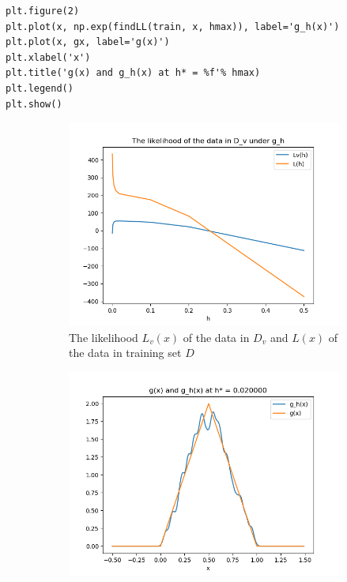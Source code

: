 \documentclass[preprint,12pt]{elsarticle}
\begin{document}
\begin{enumerate}[label=\alph*]
\begin{lstlisting}
plt.figure(2)
plt.plot(x, np.exp(findLL(train, x, hmax)), label='g_h(x)')
plt.plot(x, gx, label='g(x)')
plt.xlabel('x')
plt.title('g(x) and g_h(x) at h* = %f'% hmax)
plt.legend()
plt.show()
        \end{lstlisting}
        \begin{figure}[htbp!]
            \center
            \begin{subfigure}{0.8\textwidth}
                \includegraphics[width = \textwidth]{8.png}
                \caption{The likelihood $L_v(x)$ of the data in $D_v$ and 
                $L(x)$ of the data in training set $D$}
                \label{fig:51}
            \end{subfigure}
            \begin{subfigure}{0.8\textwidth}
                \includegraphics[width = \textwidth]{9.png}

\end{subfigure}
\end{figure}
\end{enumerate}
\end{document}
